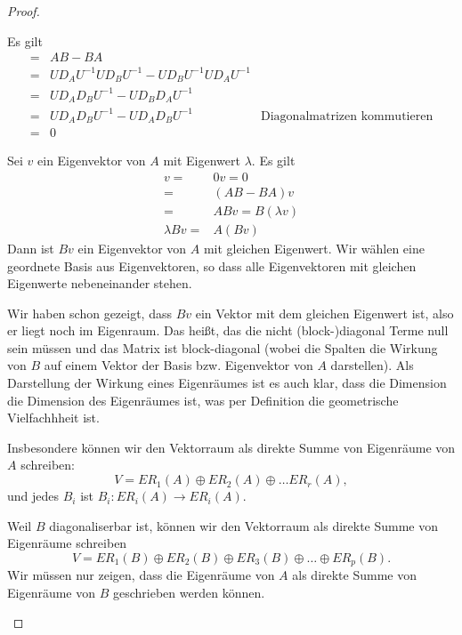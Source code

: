 \begin{proof}
	\begin{parts}
	\item Es gilt
		\begin{align*}
			[A,B]=&AB-BA\\
			=&UD_AU^{-1}UD_BU^{-1}-UD_BU^{-1}UD_AU^{-1}\\
			=&UD_AD_BU^{-1}-UD_BD_AU^{-1}\\
			=&UD_AD_BU^{-1}-UD_AD_BU^{-1} & \text{Diagonalmatrizen kommutieren}\\
			=&0
		\end{align*}
	\item Sei $v$ ein Eigenvektor von $A$ mit Eigenwert $\lambda$. Es gilt
		\begin{align*}
			[A,B]v=&0v=0\\
			=&(AB-BA)v\\
			=&ABv=B(\lambda v)\\
			\lambda Bv=&A(Bv)
		\end{align*}
		Dann ist $Bv$ ein Eigenvektor von $A$ mit gleichen Eigenwert. Wir wählen eine geordnete Basis aus Eigenvektoren, so dass alle Eigenvektoren mit gleichen Eigenwerte nebeneinander stehen. 

		Wir haben schon gezeigt, dass $B v$ ein Vektor mit dem gleichen Eigenwert ist, also er liegt noch im Eigenraum. Das heißt, das die nicht (block-)diagonal Terme null sein müssen und das Matrix ist block-diagonal (wobei die Spalten die Wirkung von $B$ auf einem Vektor der Basis bzw. Eigenvektor von $A$ darstellen). Als Darstellung der Wirkung eines Eigenräumes ist es auch klar, dass die Dimension die Dimension des Eigenräumes ist, was per Definition die geometrische Vielfachhheit ist.

	Insbesondere können wir den Vektorraum als direkte Summe von Eigenräume von $A$ schreiben:
	\[
	V=ER_1(A)\oplus ER_2(A)\oplus\dots ER_r(A)
	,\] 
	und jedes $B_i$ ist $B_i:ER_i(A)\to ER_i(A)$.
	\item Weil $B$ diagonaliserbar ist, können wir den Vektorraum als direkte Summe von Eigenräume schreiben
		\[
		V=ER_1(B)\oplus ER_2(B)\oplus ER_3(B)\oplus\dots \oplus ER_p(B)
		.\] 
Wir müssen nur zeigen, dass die Eigenräume von $A$ als direkte Summe von Eigenräume von $B$ geschrieben werden können.


	\end{parts}
\end{proof}
